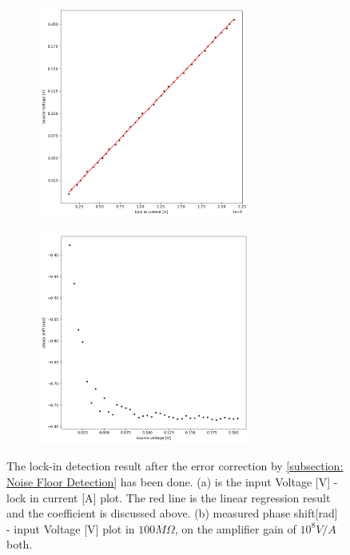 \documentclass{article}
\begin{document}
\begin{figure}[H]
    \centering
    \begin{subfigure}[b]{7cm}
        \centering
        \includegraphics[width=7cm]{./figs/V-I fitted plot at 1[kHz], 100MOhm.png}
        \caption{}
    \end{subfigure}
    \begin{subfigure}[b]{7cm}
        \centering
        \includegraphics[width=7cm]{./figs/phi-V raw figure at 1[kHz], 100MOhm.png}
        \caption{}
    \end{subfigure}
    \hfill
    \caption{
        The lock-in detection result after the error correction by \ref{subsection: Noise Floor Detection} has been done.
        (a) is the input Voltage [V] - lock in current [A] plot. The red line is the linear regression result and the coefficient is discussed above.
        (b) measured phase shift[rad] - input Voltage [V] plot in $100M\Omega$, on the amplifier gain of $10^8 V/A$ both.
    }
    \label{fig: resistance measurement result}
\end{figure}
\end{document}
